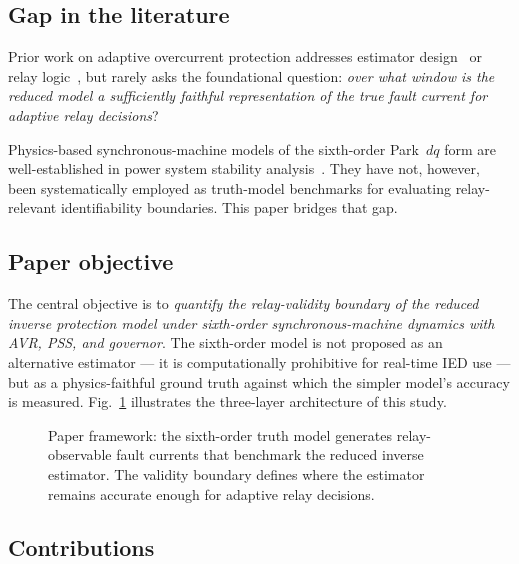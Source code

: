 \documentclass[journal,twoside,letterpaper]{IEEEtran}
\begin{document}
\subsection{Gap in the literature}

Prior work on adaptive overcurrent protection addresses
estimator design~\cite{Lazkano2000,Sachdev1985} or relay
logic~\cite{Urdaneta1988,So2000}, but rarely asks the
foundational question: \emph{over what window is the reduced
model a sufficiently faithful representation of the true fault
current for adaptive relay decisions}?

Physics-based synchronous-machine models of the sixth-order
Park~$dq$ form are well-established in power system
stability analysis~\cite{Kundur1994,Anderson1977}.
They have not, however, been systematically employed as
truth-model benchmarks for evaluating relay-relevant
identifiability boundaries.
This paper bridges that gap.

\subsection{Paper objective}

The central objective is to \emph{quantify the relay-validity
boundary of the reduced inverse protection model under
sixth-order synchronous-machine dynamics with AVR, PSS, and
governor}.
The sixth-order model is not proposed as an alternative
estimator --- it is computationally prohibitive for real-time
IED use --- but as a physics-faithful ground truth against
which the simpler model's accuracy is measured.
Fig.~\ref{fig:concept} illustrates the three-layer
architecture of this study.

\begin{figure}[!t]
  \centering
  
  \caption{Paper framework: the sixth-order truth model
    generates relay-observable fault currents that benchmark
    the reduced inverse estimator.
    The validity boundary defines where the estimator remains
    accurate enough for adaptive relay decisions.}
  \label{fig:concept}
\end{figure}

\subsection{Contributions}
\end{document}
